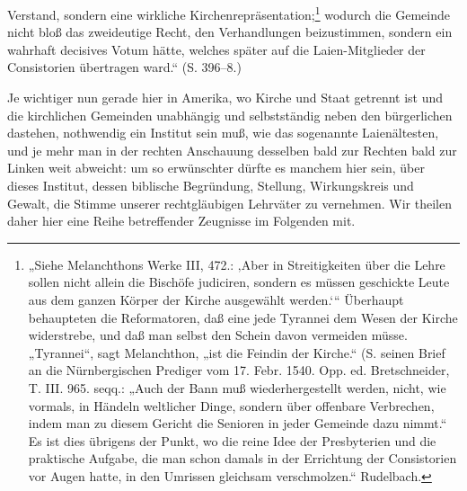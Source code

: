  Verstand, sondern eine wirkliche Kirchenrepräsentation;\footnote{„Siehe Melanchthons Werke III, 472.: ‚Aber in Streitigkeiten über die Lehre sollen nicht allein die Bischöfe judiciren, sondern es müssen geschickte Leute aus dem ganzen Körper der Kirche ausgewählt werden.‘“ Überhaupt behaupteten die Reformatoren, daß eine jede Tyrannei dem Wesen der Kirche widerstrebe, und daß man selbst den Schein davon vermeiden müsse. „Tyrannei“, sagt Melanchthon, „ist die Feindin der Kirche.“ (S. seinen Brief an die Nürnbergischen Prediger vom 17. Febr. 1540. Opp. ed. Bretschneider, T. III. 965. seqq.: „Auch der Bann muß wiederhergestellt werden, nicht, wie vormals, in Händeln weltlicher Dinge, sondern über offenbare Verbrechen, indem man zu diesem Gericht die Senioren in jeder Gemeinde dazu nimmt.“ Es ist dies übrigens der Punkt, wo die reine Idee der Presbyterien und die praktische Aufgabe, die man schon damals in der Errichtung der Consistorien vor Augen hatte, in den Umrissen gleichsam verschmolzen.“ Rudelbach.} wodurch die Gemeinde nicht bloß das zweideutige Recht, den Verhandlungen beizustimmen, sondern ein wahrhaft decisives Votum hätte, welches später auf die Laien-Mitglieder der Consistorien übertragen ward.“ (S. 396–8.)

Je wichtiger nun gerade hier in Amerika, wo Kirche und Staat getrennt ist und die kirchlichen Gemeinden unabhängig und selbstständig neben den bürgerlichen dastehen, nothwendig ein Institut sein muß, wie das sogenannte Laienältesten, und je mehr man in der rechten Anschauung desselben bald zur Rechten bald zur Linken weit abweicht: um so erwünschter dürfte es manchem hier sein, über dieses Institut, dessen biblische Begründung, Stellung, Wirkungskreis und Gewalt, die Stimme unserer rechtgläubigen Lehrväter zu vernehmen. Wir theilen daher hier eine Reihe betreffender Zeugnisse im Folgenden mit.

